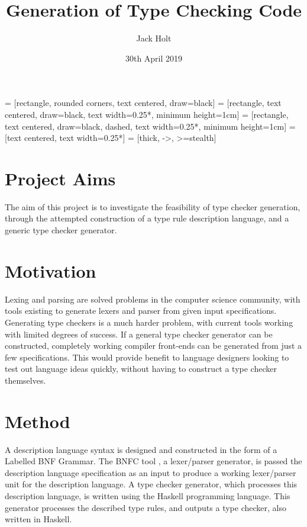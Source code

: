 \documentclass{UoYCSproject}
\title{Generation of Type Checking Code}
\author{Jack Holt}
\date{30th April 2019}
\begin{document}
 = [rectangle, rounded corners, text centered, draw=black]
 = [rectangle, text centered, draw=black,
text width=0.25*\columnwidth, minimum height=1cm]
 = [rectangle, text centered, draw=black, dashed,
text width=0.25*\columnwidth, minimum height=1cm]
 = [text centered, text width=0.25*\columnwidth]
 = [thick, ->, >=stealth]

\maketitle
\listoffigures
{}

\begin{summary}

    \section{Project Aims}
    The aim of this project is to investigate the feasibility of type checker
    generation, through the attempted construction of a type rule description
    language, and a generic type checker generator.

    \section{Motivation}
    Lexing and parsing are solved problems in the computer science community,
    with tools existing to generate lexers and parser from given input
    specifications. Generating type checkers is a much harder problem, with 
    current tools working with limited degrees of success. If a general type
    checker generator can be constructed, completely working compiler front-ends
    can be generated from just a few specifications. This would provide benefit
    to language designers looking to test out language ideas quickly, without
    having to construct a type checker themselves.

    \section{Method}
    A description language syntax is designed and constructed in the form of a 
    Labelled BNF Grammar. The BNFC tool \cite{BNFC}, a lexer/parser generator,
    is passed the description language specification as an input to produce a 
    working lexer/parser unit for the description language. A type checker 
    generator, which processes this description language, is written using the 
    Haskell programming language. This generator processes the described
    type rules, and outputs a type checker, also written in Haskell.


\end{summary}
\end{document}
